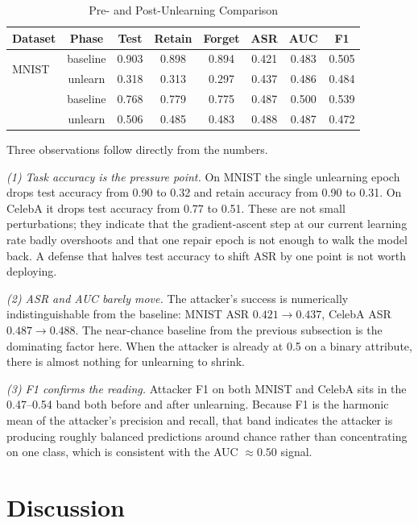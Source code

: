 \documentclass[sigconf,anonymous]{acmart}
\begin{document}
\begin{table}[t]
\centering
\footnotesize
\setlength{\tabcolsep}{3pt}
\caption{Pre- and Post-Unlearning Comparison}
\label{tab:delta}
\begin{tabular}{@{}lccccccc@{}}
\toprule
Dataset & Phase & Test & Retain & Forget & ASR & AUC & F1 \\
\midrule
\multirow{2}{*}{MNIST}
    & baseline & 0.903 & 0.898 & 0.894 & 0.421 & 0.483 & 0.505 \\
    & unlearn  & 0.318 & 0.313 & 0.297 & 0.437 & 0.486 & 0.484 \\
\addlinespace[2pt]
\multirow{2}{*}{CelebA}
    & baseline & 0.768 & 0.779 & 0.775 & 0.487 & 0.500 & 0.539 \\
    & unlearn  & 0.506 & 0.485 & 0.483 & 0.488 & 0.487 & 0.472 \\
\bottomrule
\end{tabular}
\end{table}

Three observations follow directly from the numbers.

\emph{(1) Task accuracy is the pressure point.} On MNIST the single unlearning epoch drops test accuracy from 0.90 to 0.32 and retain accuracy from 0.90 to 0.31. On CelebA it drops test accuracy from 0.77 to 0.51. These are not small perturbations; they indicate that the gradient-ascent step at our current learning rate badly overshoots and that one repair epoch is not enough to walk the model back. A defense that halves test accuracy to shift ASR by one point is not worth deploying.

\emph{(2) ASR and AUC barely move.} The attacker's success is numerically indistinguishable from the baseline: MNIST ASR $0.421 \rightarrow 0.437$, CelebA ASR $0.487 \rightarrow 0.488$. The near-chance baseline from the previous subsection is the dominating factor here. When the attacker is already at 0.5 on a binary attribute, there is almost nothing for unlearning to shrink.

\emph{(3) F1 confirms the reading.} Attacker F1 on both MNIST and CelebA sits in the 0.47--0.54 band both before and after unlearning. Because F1 is the harmonic mean of the attacker's precision and recall, that band indicates the attacker is producing roughly balanced predictions around chance rather than concentrating on one class, which is consistent with the AUC $\approx 0.50$ signal.

\section{Discussion}
\end{document}
